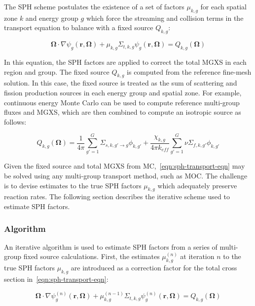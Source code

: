 The SPH scheme postulates the existence of a set of factors $\mu_{k,g}$ for each spatial zone $k$ and energy group $g$ which force the streaming and collision terms in the transport equation to balance with a fixed source $Q_{k,g}$:

\begin{dmath}
\label{eqn:sph-transport-eqn}
\mathbf{\Omega} \cdot \nabla \psi_{g}(\mathbf{r},\mathbf{\Omega}) + \mu_{k,g}\Sigma_{t,k,g}\psi_{g}(\mathbf{r},\mathbf{\Omega}) = Q_{k,g}(\mathbf{\Omega})
\end{dmath}

\noindent In this equation, the SPH factors are applied to correct the total MGXS in each region and group. The fixed source $Q_{k,g}$ is computed from the reference fine-mesh solution. In this case, the fixed source is treated as the sum of scattering and fission production sources in each energy group and spatial zone. For example, continuous energy Monte Carlo can be used to compute reference multi-group fluxes and MGXS, which are then combined to compute an isotropic source as follows:

\begin{dmath}
\label{eqn:sph-source}
Q_{k,g}(\mathbf{\Omega}) = \frac{1}{4\pi} \sum_{g'=1}^{G} \Sigma_{s,k,g' \rightarrow g}\phi_{k,g'} + \frac{\chi_{k,g}}{4\pi k_{eff}}\sum_{g'=1}^{G} \nu\Sigma_{f,k,g'}\phi_{k,g'}
\end{dmath}

\noindent Given the fixed source and total MGXS from MC,~\autoref{eqn:sph-transport-eqn} may be solved using any multi-group transport method, such as MOC. The challenge is to devise estimates to the true SPH factors $\mu_{k,g}$ which adequately preserve reaction rates. The following section describes the iterative scheme used to estimate SPH factors.


\subsubsection{Algorithm}
\label{subsubsec:sph-algorithm}

An iterative algorithm is used to estimate SPH factors from a series of multi-group fixed source calculations. First, the estimates $\mu_{k,g}^{(n)}$ at iteration $n$ to the true SPH factors $\mu_{k,g}$ are introduced as a correction factor for the total cross section in~\autoref{eqn:sph-transport-eqn}:

\begin{dmath}
\label{eqn:sph-transport-eqn-iterate}
\mathbf{\Omega} \cdot \nabla \psi_{g}^{(n)}(\mathbf{r},\mathbf{\Omega}) + \mu_{k,g}^{(n-1)}\Sigma_{t,k,g}\psi_{g}^{(n)}(\mathbf{r},\mathbf{\Omega}) = Q_{k,g}(\mathbf{\Omega})
\end{dmath}

